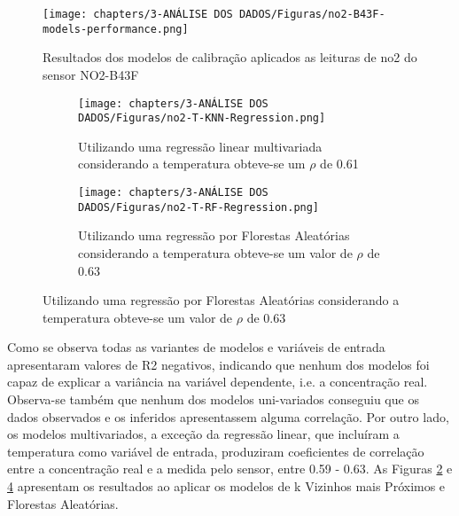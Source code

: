 \begin{figure}[h!]
    \centering
    \caption{Resultados dos modelos de calibração aplicados as leituras de \acrshort{no2} do sensor NO2-B43F}
    \texttt{[image: chapters/3-ANÁLISE DOS DADOS/Figuras/no2-B43F-models-performance.png]}
    \label{fig:data-no2-models-performance}
\end{figure}

\begin{figure}[h!]
    \centering
    \caption{Gráfico de dispersão das leituras do sensor de \acrshort{no2} NO2-B43F e a estação de referência após aplicar modelos de regressão considerando a temperatura}
    \begin{subfigure}{0.49\textwidth}
        \texttt{[image: chapters/3-ANÁLISE DOS DADOS/Figuras/no2-T-KNN-Regression.png]}
        \caption{Utilizando uma regressão linear multivariada considerando a temperatura obteve-se um $\rho$ de 0.61}
        \label{fig:data-no2-T-reference-corr-KNN}
    \end{subfigure}
    \hfill
    \begin{subfigure}{0.49\textwidth}
        \texttt{[image: chapters/3-ANÁLISE DOS DADOS/Figuras/no2-T-RF-Regression.png]}
        \caption{Utilizando uma regressão por Florestas Aleatórias considerando a temperatura obteve-se um valor de $\rho$ de 0.63}
        \label{fig:data-no2-T-reference-corr-RF}
    \end{subfigure}
\end{figure}

Como se observa todas as variantes de modelos e variáveis de entrada apresentaram valores de R2 negativos, indicando que nenhum dos modelos foi capaz de explicar a variância na variável dependente, i.e. a concentração real. Observa-se também que nenhum dos modelos uni-variados conseguiu que os dados observados e os inferidos apresentassem alguma correlação. Por outro lado, os modelos multivariados, a exceção da regressão linear, que incluíram a temperatura como variável de entrada, produziram coeficientes de correlação entre a concentração real e a medida pelo sensor, entre 0.59 - 0.63. As Figuras \ref{fig:data-no2-T-reference-corr-KNN} e \ref{fig:data-no2-T-reference-corr-RF} apresentam os resultados ao aplicar os modelos de k Vizinhos mais Próximos e Florestas Aleatórias.
